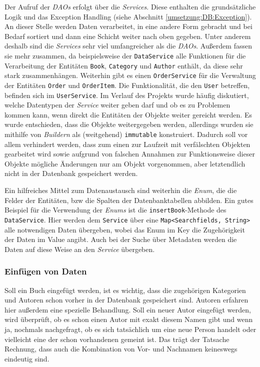 		Der Aufruf der \textit{DAOs} erfolgt über die \textit{Services}. Diese enthalten die grundsätzliche Logik und das Exception Handling (siehe Abschnitt \ref{umsetzung:DB:Exception}). An dieser Stelle werden Daten verarbeitet, in eine andere Form gebracht und bei Bedarf sortiert und dann eine Schicht weiter nach oben gegeben. Unter anderem deshalb sind die \textit{Services} sehr viel umfangreicher als die \textit{DAOs}. Außerdem fassen sie mehr zusammen, da beispielsweise der \texttt{DataService} alle Funktionen für die Verarbeitung der Entitäten \texttt{Book}, \texttt{Category} und \texttt{Author} enthält, da diese sehr stark zusammenhängen. Weiterhin gibt es einen \texttt{OrderService} für die Verwaltung der Entitäten \texttt{Order} und \texttt{OrderItem}. Die Funktionalität, die den \texttt{User} betreffen, befinden sich im \texttt{UserService}. Im Verlauf des Projekts wurde häufig diskutiert, welche Datentypen der \textit{Service} weiter geben darf und ob es zu Problemen kommen kann, wenn direkt die Entitäten der Objekte weiter gereicht werden. Es wurde entschieden, dass die Objekte weitergegeben werden, allerdings wurden sie mithilfe von \textit{Buildern} als (weitgehend) \texttt{immutable} konstruiert. Dadurch soll vor allem verhindert werden, dass zum einen zur Laufzeit mit verfälschten Objekten gearbeitet wird sowie aufgrund von falschen Annahmen zur Funktionsweise dieser Objekte mögliche Änderungen nur am Objekt vorgenommen, aber letztendlich nicht in der Datenbank gespeichert werden.
		 
		Ein hilfreiches Mittel zum Datenaustausch sind weiterhin die \textit{Enum}, die die Felder der Entitäten, bzw die Spalten der Datenbanktabellen abbilden. Ein gutes Beispiel für die Verwendung der \textit{Enums} ist die \texttt{insertBook}-Methode des \texttt{DataService}. Hier werden dem \texttt{Service} über eine \texttt{Map\textless Searchfields, String\textgreater } alle notwendigen Daten übergeben, wobei das Enum im Key die Zugehörigkeit der Daten im Value angibt. Auch bei der Suche über Metadaten werden die Daten auf diese Weise an den \textit{Service} übergeben.
		
		\subsubsection{Einfügen von Daten}\label{umsetzung:DB:Einfuegen}
		Soll ein Buch eingefügt werden, ist es wichtig, dass die zugehörigen Kategorien und Autoren schon vorher in der Datenbank gespeichert sind. Autoren erfahren hier außerdem eine spezielle Behandlung. Soll ein neuer Autor eingefügt werden, wird überprüft, ob es schon einen Autor mit exakt diesem Namen gibt und wenn ja, nochmals nachgefragt, ob es sich tatsächlich um eine neue Person handelt oder vielleicht eine der schon vorhandenen gemeint ist. Das trägt der Tatsache Rechnung, dass auch die Kombination von Vor- und Nachnamen keineswegs eindeutig sind. 
		

